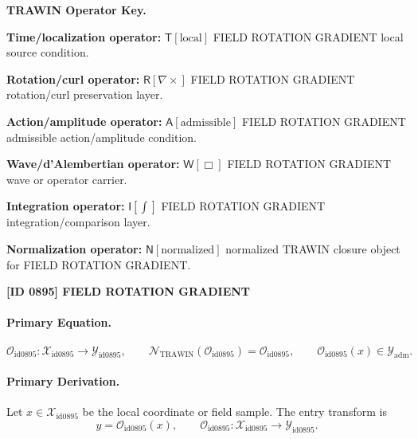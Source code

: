 \par\vspace{0.45\baselineskip}
\noindent\begin{minipage}[t]{\linewidth}
\begingroup
\small
\raggedright
\textbf{TRAWIN Operator Key.}\par
\noindent\textbf{Time/localization operator:} $\mathsf{T}\!\left[\mathrm{local}\right]$ FIELD ROTATION GRADIENT local source condition.\par
\noindent\textbf{Rotation/curl operator:} $\mathsf{R}\!\left[\nabla\times\right]$ FIELD ROTATION GRADIENT rotation/curl preservation layer.\par
\noindent\textbf{Action/amplitude operator:} $\mathsf{A}\!\left[\mathrm{admissible}\right]$ FIELD ROTATION GRADIENT admissible action/amplitude condition.\par
\noindent\textbf{Wave/d'Alembertian operator:} $\mathsf{W}\!\left[\Box\right]$ FIELD ROTATION GRADIENT wave or operator carrier.\par
\noindent\textbf{Integration operator:} $\mathsf{I}\!\left[\int\right]$ FIELD ROTATION GRADIENT integration/comparison layer.\par
\noindent\textbf{Normalization operator:} $\mathsf{N}\!\left[\mathrm{normalized}\right]$ normalized TRAWIN closure object for FIELD ROTATION GRADIENT.\par
\endgroup
\end{minipage}

\clearpage
\noindent\textbf{[ID 0895] FIELD ROTATION GRADIENT}\par
\vspace{0.35em}
\paragraph{Primary Equation.}
\[
\mathcal{O}_{\mathrm{id0895}}:\mathcal{X}_{\mathrm{id0895}}\longrightarrow \mathcal{Y}_{\mathrm{id0895}},\qquad
\mathcal{N}_{\mathrm{TRAWIN}}(\mathcal{O}_{\mathrm{id0895}})=\mathcal{O}_{\mathrm{id0895}},\qquad
\mathcal{O}_{\mathrm{id0895}}(x)\in\mathcal{Y}_{\mathrm{adm}}.
\]

\paragraph{Primary Derivation.} Let $x\in \mathcal{X}_{\mathrm{id0895}}$ be the local coordinate or field sample.  The entry transform is\[
y=\mathcal{O}_{\mathrm{id0895}}(x),\qquad \mathcal{O}_{\mathrm{id0895}}:\mathcal{X}_{\mathrm{id0895}}\longrightarrow \mathcal{Y}_{\mathrm{id0895}}.
\]

